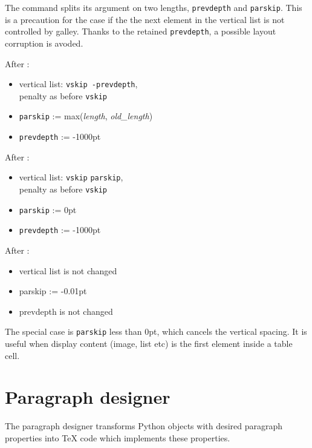 \documentclass[]{ltugboat}
\begin{document}
The command  splits its argument on two lengths, \verb|prevdepth| and \verb|parskip|. This is a precaution for the case if the the next element in the vertical list is not controlled by galley. Thanks to the retained \verb|prevdepth|, a possible layout corruption is avoded.

\medskip

After :

\begin{itemize}
\item vertical list: \verb|vskip -prevdepth|,\\penalty as before \verb|vskip|
\item \verb|parskip| := max(\textit{length}, \textit{old\_length})
\item \verb|prevdepth| := -1000pt
\end{itemize}

\medskip

After :

\begin{itemize}
\item vertical list: \verb|vskip| \verb|parskip|,\\penalty as before \verb|vskip|
\item \verb|parskip| := 0pt
\item \verb|prevdepth| := -1000pt
\end{itemize}

\medskip

After :

\begin{itemize}
\item vertical list is not changed
\item parskip := -0.01pt
\item prevdepth is not changed
\end{itemize}

The special case is \verb|parskip| less than 0pt, which cancels the vertical spacing. It is useful when display content (image, list etc) is the first element inside a table cell.

\section{Paragraph designer}

The paragraph designer transforms Python objects with desired paragraph properties into \TeX{} code which implements these properties.
\end{document}
